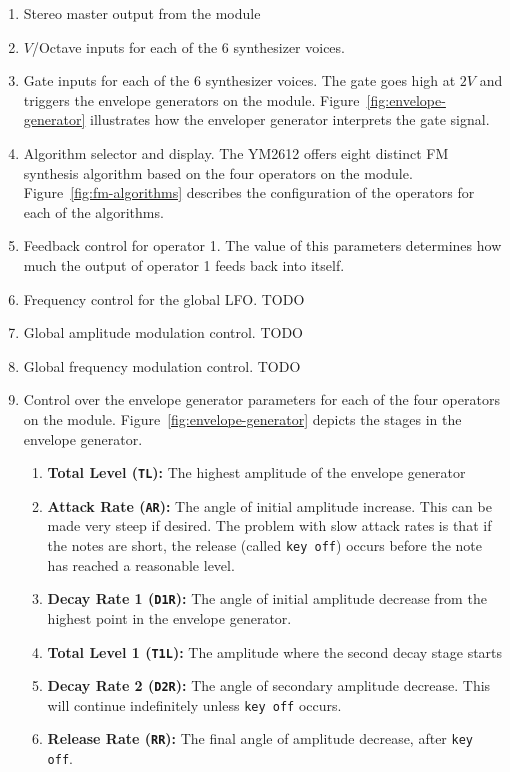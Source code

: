 \documentclass[12pt,a4paper]{article}
\begin{document}
\clearpage
\begin{enumerate}
  \item Stereo master output from the module
  \item $V$/Octave inputs for each of the 6 synthesizer voices.
  \item Gate inputs for each of the 6 synthesizer voices. The gate goes high at $2V$ and triggers the envelope generators on the module. Figure~\ref{fig:envelope-generator} illustrates how the enveloper generator interprets the gate signal.
  \item Algorithm selector and display. The YM2612 offers eight distinct FM synthesis algorithm based on the four operators on the module. Figure~\ref{fig:fm-algorithms} describes the configuration of the operators for each of the algorithms.
  \item Feedback control for operator 1. The value of this parameters determines how much the output of operator 1 feeds back into itself.
  \item Frequency control for the global LFO. TODO
  \item Global amplitude modulation control. TODO
  \item Global frequency modulation control. TODO
  \item Control over the envelope generator parameters for each of the four operators on the module. Figure~\ref{fig:envelope-generator} depicts the stages in the envelope generator. \begin{enumerate}
    \item \textbf{Total Level (\texttt{TL}):} The highest amplitude of the envelope generator
    \item \textbf{Attack Rate (\texttt{AR}):} The angle of initial amplitude increase. This can be made very steep if desired. The problem with slow attack rates is that if the notes are short, the release (called \texttt{key off}) occurs before the note has reached a reasonable level.
    \item \textbf{Decay Rate 1 (\texttt{D1R}):} The angle of initial amplitude decrease from the highest point in the envelope generator.
    \item \textbf{Total Level 1 (\texttt{T1L}):} The amplitude where the second decay stage starts
    \item \textbf{Decay Rate 2 (\texttt{D2R}):} The angle of secondary amplitude decrease. This will continue indefinitely unless \texttt{key off} occurs.
    \item \textbf{Release Rate (\texttt{RR}):} The final angle of amplitude decrease, after \texttt{key off}.

\end{enumerate}
\end{enumerate}
\end{document}
